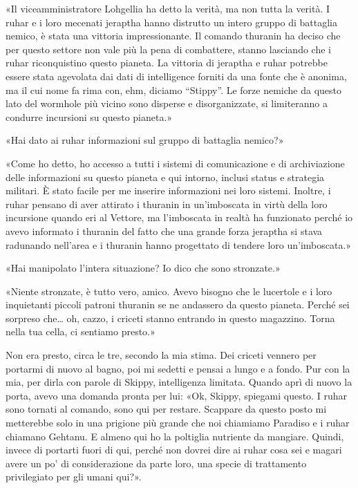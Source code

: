 «Il viceamministratore Lohgellia ha detto la verità, ma non tutta la
verità. I ruhar e i loro mecenati jeraptha hanno distrutto un intero
gruppo di battaglia nemico, è stata una vittoria impressionante. Il
comando thuranin ha deciso che per questo settore non vale più la pena
di combattere, stanno lasciando che i ruhar riconquistino questo
pianeta. La vittoria di jeraptha e ruhar potrebbe essere stata agevolata
dai dati di intelligence forniti da una fonte che è anonima, ma il cui
nome fa rima con, ehm, diciamo ``Stippy''. Le forze nemiche da questo
lato del wormhole più vicino sono disperse e disorganizzate, si
limiteranno a condurre incursioni su questo pianeta.»

«Hai dato ai ruhar informazioni sul gruppo di battaglia nemico?»

«Come ho detto, ho accesso a tutti i sistemi di comunicazione e di
archiviazione delle informazioni su questo pianeta e qui intorno,
inclusi status e strategia militari. È stato facile per me inserire
informazioni nei loro sistemi. Inoltre, i ruhar pensano di aver attirato
i thuranin in un'imboscata in virtù della loro incursione quando eri al
Vettore, ma l'imboscata in realtà ha funzionato perché io avevo
informato i thuranin del fatto che una grande forza jeraptha si stava
radunando nell'area e i thuranin hanno progettato di tendere loro
un'imboscata.»

«Hai manipolato l'intera situazione? Io dico che sono stronzate.»

«Niente stronzate, è tutto vero, amico. Avevo bisogno che le lucertole e
i loro inquietanti piccoli patroni thuranin se ne andassero da questo
pianeta. Perché sei sorpreso che\ldots{} oh, cazzo, i criceti stanno
entrando in questo magazzino. Torna nella tua cella, ci sentiamo
presto.»

\hfill\break

Non era presto, circa le tre, secondo la mia stima. Dei criceti vennero
per portarmi di nuovo al bagno, poi mi sedetti e pensai a lungo e a
fondo. Pur con la mia, per dirla con parole di Skippy, intelligenza
limitata. Quando aprì di nuovo la porta, avevo una domanda pronta per
lui: «Ok, Skippy, spiegami questo. I ruhar sono tornati al comando, sono
qui per restare. Scappare da questo posto mi metterebbe solo in una
prigione più grande che noi chiamiamo Paradiso e i ruhar chiamano
Gehtanu. E almeno qui ho la poltiglia nutriente da mangiare. Quindi,
invece di portarti fuori di qui, perché non dovrei dire ai ruhar cosa
sei e magari avere un po' di considerazione da parte loro, una specie di
trattamento privilegiato per gli umani qui?».

